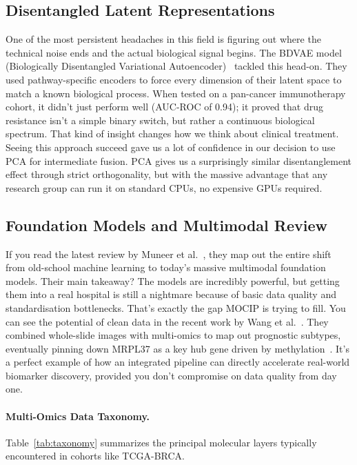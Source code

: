 \documentclass[conference,flushend]{iaria} %
\begin{document}
\subsection{Disentangled Latent Representations}
One of the most persistent headaches in this field is figuring out where the technical noise ends and the actual biological signal begins. The BDVAE model (Biologically Disentangled Variational Autoencoder)~\cite{tariq2025bdvae} tackled this head-on. They used pathway-specific encoders to force every dimension of their latent space to match a known biological process. When tested on a pan-cancer immunotherapy cohort, it didn't just perform well (AUC-ROC of 0.94); it proved that drug resistance isn't a simple binary switch, but rather a continuous biological spectrum. That kind of insight changes how we think about clinical treatment. Seeing this approach succeed gave us a lot of confidence in our decision to use PCA for intermediate fusion. PCA gives us a surprisingly similar disentanglement effect through strict orthogonality, but with the massive advantage that any research group can run it on standard CPUs, no expensive GPUs required.

\subsection{Foundation Models and Multimodal Review}
If you read the latest review by Muneer et al.~\cite{muneer2025review}, they map out the entire shift from old-school machine learning to today's massive multimodal foundation models. Their main takeaway? The models are incredibly powerful, but getting them into a real hospital is still a nightmare because of basic data quality and standardisation bottlenecks. That's exactly the gap MOCIP is trying to fill. You can see the potential of clean data in the recent work by Wang et al.~\cite{wang2025deeppathomic}. They combined whole-slide images with multi-omics to map out prognostic subtypes, eventually pinning down MRPL37 as a key hub gene driven by methylation~\cite{wang2025deeppathomic}. It's a perfect example of how an integrated pipeline can directly accelerate real-world biomarker discovery, provided you don't compromise on data quality from day one.

\paragraph{Multi-Omics Data Taxonomy.}
Table~\ref{tab:taxonomy} summarizes the principal molecular layers typically encountered in cohorts like TCGA-BRCA.
\end{document}
